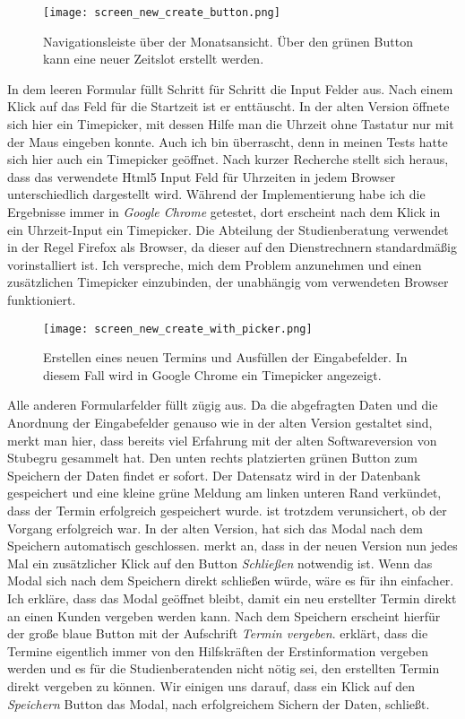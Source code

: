 \begin{figure}[H]
    \caption{Navigationsleiste über der Monatsansicht. Über den grünen Button kann eine neuer Zeitslot erstellt werden.}
    \centering
    \texttt{[image: screen\_new\_create\_button.png]}
\end{figure}

In dem leeren Formular füllt \ipName Schritt für Schritt die Input Felder aus.
Nach einem Klick auf das Feld für die Startzeit ist er enttäuscht. In der alten
Version öffnete sich hier ein \gls{Timepicker}, mit dessen Hilfe man die Uhrzeit
ohne Tastatur nur mit der Maus eingeben konnte. Auch ich bin überrascht, denn
in meinen Tests hatte sich hier auch ein Timepicker geöffnet. Nach kurzer
Recherche stellt sich heraus, dass das verwendete Html5 Input Feld für
Uhrzeiten in jedem Browser unterschiedlich dargestellt
wird\cite{htmlTimeInput}. Während der Implementierung habe ich die Ergebnisse
immer in \textit{Google Chrome} getestet, dort erscheint nach dem Klick in ein
Uhrzeit-Input ein Timepicker. Die Abteilung der Studienberatung verwendet in
der Regel Firefox als Browser, da dieser auf den Dienstrechnern standardmäßig
vorinstalliert ist. Ich verspreche, mich dem Problem anzunehmen und einen
zusätzlichen Timepicker einzubinden, der unabhängig vom verwendeten Browser
funktioniert.

\begin{figure}[H]
    \caption{Erstellen eines neuen Termins und Ausfüllen der Eingabefelder. In diesem Fall wird in Google Chrome ein Timepicker angezeigt.}
    \centering
    \texttt{[image: screen\_new\_create\_with\_picker.png]}
\end{figure}

Alle anderen Formularfelder füllt \ipName zügig aus. Da die abgefragten Daten
und die Anordnung der Eingabefelder genauso wie in der alten Version gestaltet
sind, merkt man hier, dass \ipName bereits viel Erfahrung mit der alten
Softwareversion von Stubegru gesammelt hat. Den unten rechts platzierten grünen
Button zum Speichern der Daten findet er sofort. Der Datensatz wird in der
Datenbank gespeichert und eine kleine grüne Meldung am linken unteren Rand
verkündet, dass der Termin erfolgreich gespeichert wurde. \ipName ist trotzdem
verunsichert, ob der Vorgang erfolgreich war. In der alten Version, hat sich
das Modal nach dem Speichern automatisch geschlossen. \ipName merkt an, dass in
der neuen Version nun jedes Mal ein zusätzlicher Klick auf den Button
\textit{Schließen} notwendig ist. Wenn das Modal sich nach dem Speichern direkt
schließen würde, wäre es für ihn einfacher. Ich erkläre, dass das Modal
geöffnet bleibt, damit ein neu erstellter Termin direkt an einen Kunden
vergeben werden kann. Nach dem Speichern erscheint hierfür der große blaue
Button mit der Aufschrift \textit{Termin vergeben}. \ipName erklärt, dass die
Termine eigentlich immer von den Hilfskräften der Erstinformation vergeben
werden und es für die Studienberatenden nicht nötig sei, den erstellten Termin
direkt vergeben zu können. Wir einigen uns darauf, dass ein Klick auf den
\textit{Speichern} Button das Modal, nach erfolgreichem Sichern der Daten,
schließt.

